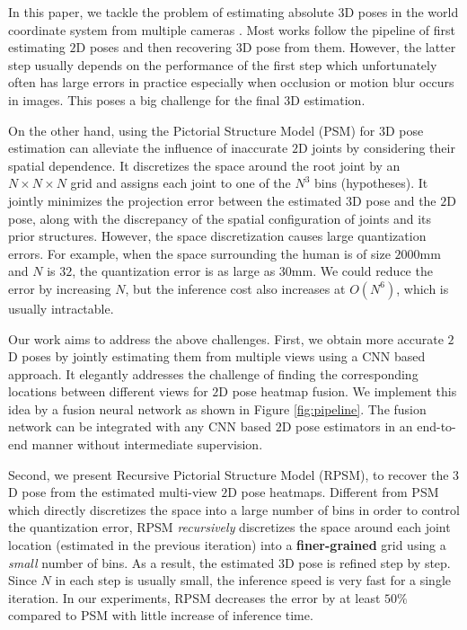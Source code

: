 \documentclass[10pt,twocolumn,letterpaper]{article}
\begin{document}
In this paper, we tackle the problem of estimating absolute $3$D poses in the world coordinate system from multiple cameras \cite{amin2013multi,liu2011markerless,burenius20133D,PavlakosZDD17,belagiannis20143D,rhodin2018learning}. Most works follow the pipeline of first estimating $2$D poses and then recovering $3$D pose from them. However, the latter step usually depends on the performance of the first step which unfortunately often has large errors in practice especially when occlusion or motion blur occurs in images. This poses a big challenge for the final $3$D estimation. 

On the other hand, using the Pictorial Structure Model (PSM) \cite{kostrikov2014depth,PavlakosZDD17,belagiannis20143D} for $3$D pose estimation can alleviate the influence of inaccurate $2$D joints by considering their spatial dependence. It discretizes the space around the root joint by an $N \times N \times N$ grid and assigns each joint to one of the $N^3$ bins (hypotheses). It jointly minimizes the projection error between the estimated $3$D pose and the $2$D pose, along with the discrepancy of the spatial configuration of joints and its prior structures. However, the space discretization causes large quantization errors. For example, when the space surrounding the human is of size $2000$mm and $N$ is $32$, the quantization error is as large as $30$mm. We could reduce the error by increasing $N$, but the inference cost also increases at $O(N^6)$, which is usually intractable. 



Our work aims to address the above challenges. First, we obtain more accurate $2$D poses by jointly estimating them from multiple views using a CNN based approach. It elegantly addresses the challenge of finding the corresponding locations between different views for $2$D pose heatmap fusion. We implement this idea by a fusion neural network as shown in Figure \ref{fig:pipeline}. The fusion network can be integrated with any CNN based $2$D pose estimators in an end-to-end manner without intermediate supervision.

Second, we present Recursive Pictorial Structure Model (RPSM), to recover the $3$D pose from the estimated multi-view $2$D pose heatmaps. Different from PSM which directly discretizes the space into a large number of bins in order to control the quantization error, RPSM \textit{recursively} discretizes the space around each joint location (estimated in the previous iteration) into a \textbf{finer-grained} grid using a \textit{small} number of bins. As a result, the estimated $3$D pose is refined step by step.  Since $N$ in each step is usually small, the inference speed is very fast for a single iteration. In our experiments, RPSM decreases the error by at least $50\%$ compared to PSM with little increase of inference time.
\end{document}

